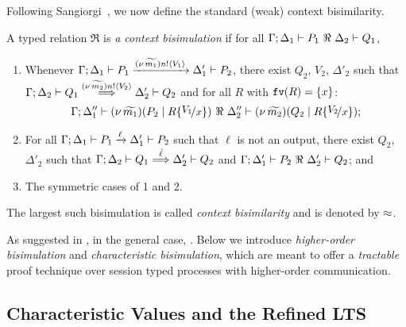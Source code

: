 Following Sangiorgi~\cite{San96H}, 
we now define the standard (weak) context bisimilarity. 
%
\begin{definition}
	\label{def:wbc}
	A typed relation $\Re$ is {\em a context bisimulation} if
	for all $\horel{\Gamma}{\Delta_1}{P_1}{\ \Re \ }{\Delta_2}{Q_1}$,
%
	\begin{enumerate}[1)] 
		\item
				Whenever 
				$\Gamma; \Delta_1 \vdash P_1 \xrightarrow{(\nu\, \widetilde{m_1}) n ! \langle V_1 \rangle} \Delta_1' \vdash P_2$,
				there exist $Q_2$, $V_2$, $\Delta'_2$
				such that $\Gamma; \Delta_2 \vdash Q_1 \stackrel{(\nu\, \widetilde{m_2}) n ! \langle V_2 \rangle}{\Longrightarrow} \Delta_2' \vdash Q_2$ and 
				for all $R$ with $\mathtt{fv}(R)=\{x\}$:
%
			\[
				\horel{\Gamma}{\Delta_1''}{\newsp{\widetilde{m_1}}{P_2 \Par R\subst{V_1}{x}}}
				{\ \Re\ }
				{\Delta_2''}{\newsp{\widetilde{m_2}}{Q_2 \Par R\subst{V_2}{x}}};
			\]

		\item	
				For all $\Gamma; \Delta_1 \vdash P_1 \xrightarrow{\ell} \Delta_1' \vdash P_2$ such that 
				$\ell$ is not an output, there exist $Q_2$, $\Delta'_2$ such that 
				$\Gamma; \Delta_2 \vdash Q_1 \stackrel{\hat{\ell}}{\Longrightarrow} \Delta_2' \vdash Q_2$
				and
				$\horel{\Gamma}{\Delta_1'}{P_2}{\ \Re \ }{\Delta_2'}{Q_2}$; and  

		\item
				The symmetric cases of 1 and 2.                
	\end{enumerate}
%
	The largest such bisimulation is called \emph{context bisimilarity} and is denoted by $\approx$.
\end{definition}

\noi As suggested in
, in the general case,
.
Below we introduce \emph{higher-order bisimulation} and \emph{characteristic bisimulation},
which are meant to offer a \emph{tractable} proof technique over session typed
processes with higher-order communication.

\subsection{Characteristic Values and the Refined LTS}
\label{ss:reflts}

